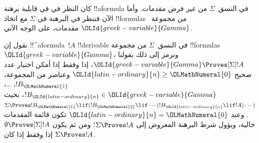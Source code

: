 \documentclass[../../../include/open-logic-section]{subfiles}
\begin{document}


كان النظر في  في قابلية برهنة !!a{formula}
في النسق~$\Sigma$ من غير فرض مقدمات. وأما الآن فننظر في البرهنة في
$\Sigma$ مع اتخاذ !!{formula}s من مجموعة~${\OLId{greek-variable}{Gamma}}$ مقدمات، على الوجه الآتي.

\begin{defn}
  نقول إن !!^a{formula}~$!A$ !!{derivable} في النسق~$\Sigma$ من مجموعة
  !!{formula}s ${\OLId{greek-variable}{Gamma}}$، ونرمز إلى ذلك بقولنا ${\OLId{greek-variable}{Gamma}} \Proves[\Sigma] !A$،
  إذا وفقط إذا أمكن اختيار عدد صحيح ${\OLId{latin-ordinary}{n}} \geq {\OLMathNumeral{0}}$ وعناصر من المجموعة،
  $!B_{\OLMathNumeral{1}}$، \dots، $!B_{\OLId{latin-ordinary}{n}} \in {\OLId{greek-variable}{Gamma}}$، بحيث
  $\Sigma \Proves !B_{\OLMathNumeral{1}} \lif (!B_{\OLMathNumeral{2}} \lif \cdots (!B_{\OLId{latin-ordinary}{n}} \lif !A)
  \cdots)$.
  وعند ${\OLId{latin-ordinary}{n}}={\OLMathNumeral{0}}$ تكون قائمة المقدمات خالية، ويؤول شرط البرهنة المعروض إلى
  $\Sigma \Proves !A$؛ ومن ثم يكون
  $\emptyset \Proves[\Sigma] !A$ إذا وفقط إذا كان $\Sigma \Proves !A$.
\end{defn}
\end{document}
